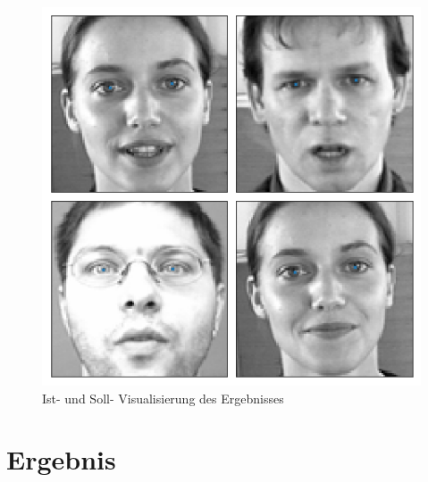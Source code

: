 \begin{figure}[ht!]
	\centering
	\includegraphics[scale=0.5]{images/normal.png}
	\caption{Ist- und Soll- Visualisierung des Ergebnisses}
	\label{fig:resultPic}
\end{figure}

\section{Ergebnis}


